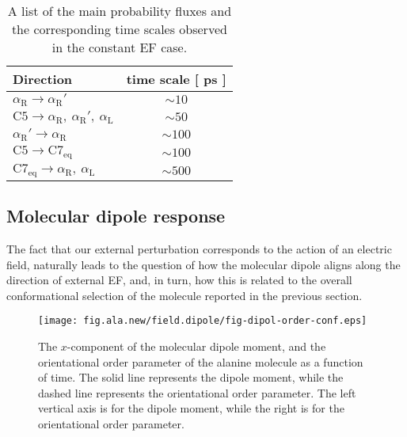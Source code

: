 \documentclass[a4paper,preprint,unsortedaddress,onecolumn]{revtex4-1}
\newcommand{\recheck}[1]{{\color{red} #1}}
\newcommand{\confaa}[0]{{\alpha_{\textrm{R}}}}
\newcommand{\confab}[0]{{\alpha_{\textrm{R}}'}}
\newcommand{\confba}[0]{{\textrm{C}7_{\textrm{eq}}}}
\newcommand{\confbb}[0]{{\textrm{C}5}}
\newcommand{\confc}[0]{{\alpha_{\textrm{L}}}}
\begin{document}
\begin{table}
  \centering
  \begin{tabular*}{0.4\textwidth}{@{\extracolsep{\fill}}lc}\hline\hline
    Direction        & time scale [ ps ] \\\hline
    $\confaa\rightarrow \confab$        &       $\sim 10$      \\
    $\confbb\rightarrow \confaa,\ \confab,\ \confc$        &       $\sim 50$      \\    
    $\confab\rightarrow \confaa$        &       $\sim 100$      \\
    $\confbb\rightarrow \confba$        &       $\sim 100$      \\    
    $\confba\rightarrow \confaa,\ \confc$        &       $\sim 500$      \\    \hline\hline
  \end{tabular*}
  \caption{A list of the main probability fluxes and the corresponding time scales observed in the constant EF case.}
  \label{tab:tmp1}
\end{table}



\subsection{Molecular dipole response}
The fact that our external perturbation corresponds to the action of
an electric field, naturally leads to the question of how
\recheck{
  the molecular dipole aligns along the direction of external EF}, and, in turn, how this is related
to the overall \recheck{conformational selection} of the molecule reported in
the previous section.
\begin{figure}
  \centering
  \texttt{[image: fig.ala.new/field.dipole/fig-dipol-order-conf.eps]}
  \caption{The
    $x$-component of the molecular dipole moment, and the orientational order parameter
    of the alanine molecule as a
    function of time. The solid line represents the dipole moment,
    while the dashed line represents the orientational order parameter.
    The left vertical axis is for the dipole moment, while
    the right is for the orientational order parameter.
  }
  \label{fig:tmp3}
\end{figure}
\end{document}
